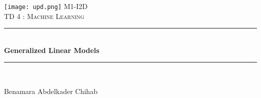 \documentclass[12pt]{article}
\begin{document}
 

\begin{titlepage}
\lhead{\textcolor{primaryColor}{ML M1-IDD - 2020/2021}}

\newcommand{\HRule}{\rule{\linewidth}{0.5mm}} 

\center
 


\texttt{[image: upd.png]}
\center\textsc{\large M1-I2D}\\[0.5cm]
\vspace{2cm}
\textsc{\Large \textcolor{primaryColor}{TD 4 :} Machine Learning}\\[1.5cm] 



\HRule \\[0.4cm]
{ \huge \bfseries Generalized Linear Models}\\[0.4cm] 
\HRule \\[1.5cm]
 

\begin{minipage}{0.4\textwidth}
\begin{flushleft} \large
Benamara Abdelkader Chihab 
\end{flushleft}
\end{minipage}
\vspace{2cm}



\date{\today}



\vfill 

\end{titlepage}
\end{document}
